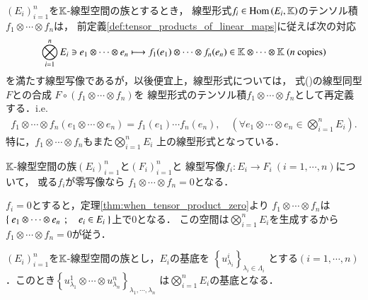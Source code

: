 	\begin{screen}
		\begin{dfn}[線型形式のテンソル積]
			$(E_i)_{i=1}^n$を$\mathbb{K}$-線型空間の族とするとき，
			線型形式$f_i \in \mathrm{Hom} \left(E_i,\mathbb{K}\right)$のテンソル積
			$f_1 \otimes \cdots \otimes f_n$は，
			前定義\ref{def:tensor_products_of_linear_maps}に従えば次の対応
			\begin{align}
				\bigotimes_{i=1}^n E_i \ni e_1 \otimes \cdots \otimes e_n
				\longmapsto f_1(e_1) \otimes \cdots \otimes f_n(e_n)
				\in \mathbb{K} \otimes \cdots \otimes \mathbb{K}\ (\mbox{$n$ copies})
			\end{align}
			を満たす線型写像であるが，以後便宜上，線型形式については，
			式()の線型同型$F$との合成
			$F \circ (f_1 \otimes \cdots \otimes f_n)$を
			線型形式のテンソル積$f_1 \otimes \cdots \otimes f_n$として再定義する．i.e.
			\begin{align}
				f_1 \otimes \cdots \otimes f_n(e_1 \otimes \cdots \otimes e_n)
				= f_1(e_1) \cdots f_n(e_n),
				\quad (\forall e_1 \otimes \cdots \otimes e_n \in \bigotimes_{i=1}^n E_i).
			\end{align}
			特に，$f_1 \otimes \cdots \otimes f_n$もまた$\bigotimes_{i=1}^n E_i$
			上の線型形式となっている．
		\end{dfn}
	\end{screen}
	
	\begin{screen}
		\begin{thm}[零写像のテンソル積は零写像]
		\label{thm:tensor_product_contains_zero_mapping_is_zero}
			$\mathbb{K}$-線型空間の族$(E_i)_{i=1}^n$と$(F_i)_{i=1}^n$と
			線型写像$f_i:E_i \longrightarrow F_i\ (i=1,\cdots,n)$について，
			或る$f_i$が零写像なら
			$f_1 \otimes \cdots \otimes f_n = 0$となる．
		\end{thm}
	\end{screen}
	
	\begin{prf}
		$f_i = 0$とすると，定理\ref{thm:when_tensor_product_zero}より
		$f_1 \otimes \cdots \otimes f_n$は
		$\left\{\ e_1 \otimes \cdots \otimes e_n\ \, ; \quad e_i \in E_i\ \right\}$上で0となる．
		この空間は$\bigotimes_{i=1}^{n} E_i$を生成するから
		$f_1 \otimes \cdots \otimes f_n = 0$が従う．
		\QED
	\end{prf}
	
	\begin{screen}
		\begin{thm}[テンソル積の基底]\label{thm:basis_of_tensor_product}
			$(E_i)_{i=1}^n$を$\mathbb{K}$-線型空間の族とし，$E_i$の基底を
			$\left\{ u^i_{\lambda_i} \right\}_{\lambda_i \in \Lambda_i}$
			とする$(i=1,\cdots,n)$．このとき$\left\{ u^1_{\lambda_1} \otimes 
			\cdots \otimes u^n_{\lambda_n} \right\}_{\lambda_1,\cdots,\lambda_n}$
			は$\bigotimes_{i=1}^n E_i$の基底となる．
		\end{thm}
	\end{screen}
	
